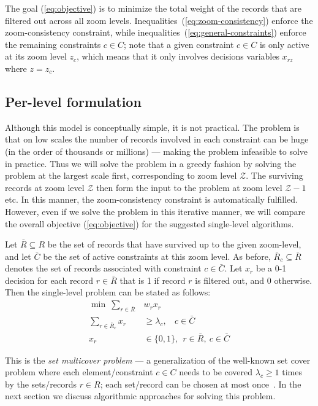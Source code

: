 The goal (\ref{eq:objective}) is to minimize the total weight of the records that are filtered out across all zoom levels. Inequalities~(\ref{eq:zoom-consistency}) enforce the zoom-consistency constraint, while inequalities~(\ref{eq:general-constraints}) enforce the remaining constraints $c \in C$; note that a given constraint $c \in C$ is only active at its zoom level $z_c$, which means that it only involves decisions variables $x_{rz}$ where $z = z_c$.

\subsection{Per-level formulation}

Although this model is conceptually simple, it is not practical. The problem is that on low scales the number of records involved in each constraint can be huge (in the order of thousands or millions) --- making the problem infeasible to solve in practice. Thus we will solve the problem in a greedy fashion by solving the problem at the largest scale first, corresponding to zoom level $\mathcal{Z}$. The surviving records at zoom level $\mathcal{Z}$ then form the input to the problem at zoom level $\mathcal{Z}-1$ etc. In this manner, the zoom-consistency constraint is automatically fulfilled. However, even if we solve the problem in this iterative manner, we will compare the overall objective (\ref{eq:objective}) for the suggested single-level algorithms. 

Let $\bar{R} \subseteq R$ be the set of records that have survived up to the given zoom-level, and let $\bar{C}$ be the set of active constraints at this zoom level. As before, $\bar{R}_c \subseteq \bar{R}$ denotes the set of records associated with constraint $c \in \bar{C}$. Let $x_r$ be a 0-1 decision for each record $r \in \bar{R}$ that is 1 if record $r$ is filtered out, and 0 otherwise. Then the single-level problem can be stated as follows:
\begin{align}
  \label{eq:objective-single}
  \min ~\sum_{r \in \bar{R}} &w_r x_r \\
  \label{eq:general-constraints-single}
  \sum_{r \in \bar{R}_c} x_r &\geq \lambda_c, ~~~~ c \in \bar{C} \\
  x_r & \in \{0, 1\}, ~~ r \in \bar{R}, ~c \in \bar{C}
\end{align}

This is the \emph{set multicover problem} --- a generalization of the well-known set cover problem where each element/constraint $c \in C$ needs to be covered $\lambda_c \geq 1$ times by the sets/records $r \in R$; each set/record can be chosen at most once~\cite{RajogopalanVazirani98}. In the next section we discuss algorithmic approaches for solving this problem.
